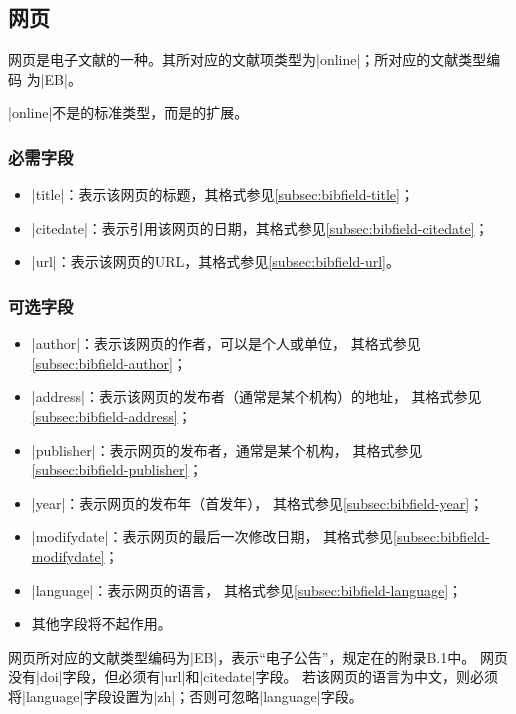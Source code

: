 \subsection{网页}\label{subsec:bibtype-online}

网页是电子文献的一种。其所对应的{\BibTeX}文献项类型为|online|；所对应的文献类型编码
为|EB|\cite{gbt7714-2005}。

|online|不是{\BibTeX}的标准类型，而是{\njuthesis}的扩展。

\subsubsection{必需字段}

\begin{itemize}
\item |title|：表示该网页的标题，其格式参见\ref{subsec:bibfield-title}；
\item |citedate|：表示引用该网页的日期，其格式参见\ref{subsec:bibfield-citedate}；
\item |url|：表示该网页的URL，其格式参见\ref{subsec:bibfield-url}。
\end{itemize}

\subsubsection{可选字段}

\begin{itemize}
\item |author|：表示该网页的作者，可以是个人或单位，
    其格式参见\ref{subsec:bibfield-author}；
\item |address|：表示该网页的发布者（通常是某个机构）的地址，
    其格式参见\ref{subsec:bibfield-address}；
\item |publisher|：表示网页的发布者，通常是某个机构，
    其格式参见\ref{subsec:bibfield-publisher}；
\item |year|：表示网页的发布年（首发年），
    其格式参见\ref{subsec:bibfield-year}；
\item |modifydate|：表示网页的最后一次修改日期，
    其格式参见\ref{subsec:bibfield-modifydate}；
\item |language|：表示网页的语言，
    其格式参见\ref{subsec:bibfield-language}；
\item 其他字段将不起作用。
\end{itemize}

\begin{note}
网页所对应的文献类型编码为|EB|，表示“电子公告”，规定在\cite{gbt7714-2005}的附录B.1中。
网页没有|doi|字段，但必须有|url|和|citedate|字段。
若该网页的语言为中文，则必须将|language|字段设置为|zh|；否则可忽略|language|字段。
\end{note}

